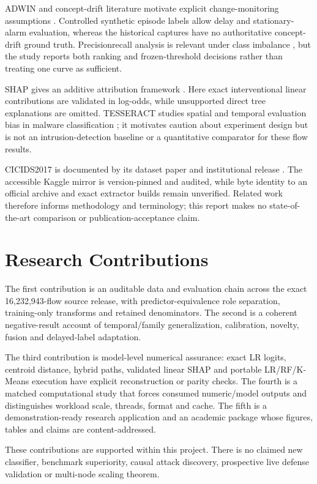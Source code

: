 \documentclass[conference]{IEEEtran}
\begin{document}
ADWIN and concept-drift literature motivate explicit change-monitoring assumptions \cite{adwin,drift}. Controlled synthetic episode labels allow delay and stationary-alarm evaluation, whereas the historical captures have no authoritative concept-drift ground truth. Precisionrecall analysis is relevant under class imbalance \cite{pr}, but the study reports both ranking and frozen-threshold decisions rather than treating one curve as sufficient.

SHAP gives an additive attribution framework \cite{shap}. Here exact interventional linear contributions are validated in log-odds, while unsupported direct tree explanations are omitted. TESSERACT studies spatial and temporal evaluation bias in malware classification \cite{tesseract}; it motivates caution about experiment design but is not an intrusion-detection baseline or a quantitative comparator for these flow results.

CICIDS2017 is documented by its dataset paper and institutional release \cite{cicids,unb}. The accessible Kaggle mirror is version-pinned and audited, while byte identity to an official archive and exact extractor builds remain unverified. Related work therefore informs methodology and terminology; this report makes no state-of-the-art comparison or publication-acceptance claim.

\section{Research Contributions}
The first contribution is an auditable data and evaluation chain across the exact 16,232,943-flow source release, with predictor-equivalence role separation, training-only transforms and retained denominators. The second is a coherent negative-result account of temporal/family generalization, calibration, novelty, fusion and delayed-label adaptation.

The third contribution is model-level numerical assurance: exact LR logits, centroid distance, hybrid paths, validated linear SHAP and portable LR/RF/K-Means execution have explicit reconstruction or parity checks. The fourth is a matched computational study that forces consumed numeric/model outputs and distinguishes workload scale, threads, format and cache. The fifth is a demonstration-ready research application and an academic package whose figures, tables and claims are content-addressed.

These contributions are supported within this project. There is no claimed new classifier, benchmark superiority, causal attack discovery, prospective live defense validation or multi-node scaling theorem.
\end{document}
